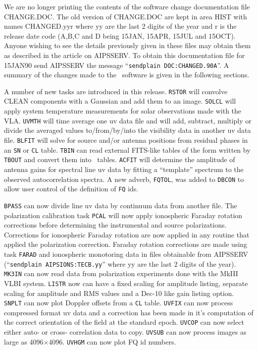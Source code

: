 
   We are no longer printing the contents of the software change
documentation file CHANGE.DOC.  The old version of CHANGE.DOC are kept
in area HIST with names CHANGED.yyr where yy are the last 2 digits of
the year and r is the release date code (A,B,C and D being 15JAN,
15APR, 15JUL and 15OCT).
Anyone wishing to see the details
previously given in these files may obtain them as described in the
article on AIPSSERV.  To obtain this documentation file for 15JAN90
send AIPSSERV the message ``{\tt sendplain DOC:CHANGED.90A}''.
A summary of the changes made to the \AIPS\
software is given in the following sections.


A number of new tasks are introduced in this release.
{\tt RSTOR} will convolve CLEAN components with a Gaussian and
add them to an image.
{\tt SOLCL} will apply system temperature measurements for solar
observations made with the VLA.
{\tt UVMTH} will time average one uv data file and will add,
subtract, multiply or divide the averaged values to/from/by/into the
visibility data in another uv data file.
{\tt BLFIT} will solve for source and/or antenna positions from
residual phases in an {\tt SN} or {\tt CL} table.
{\tt TBIN} can read external FITS-like tables of the form written
by {\tt TBOUT} and convert them into \AIPS\ tables.
{\tt ACFIT} will determine the amplitude of antenna gains for spectral line
uv data by fitting a ``template'' spectrum to the observed
autocorrelation spectra.
A new adverb, {\tt FQTOL}, was added to {\tt DBCON} to allow user
control of the definition of {\tt FQ} ids.

   {\tt BPASS} can now divide line uv data by continuum data from another file.
The polarization calibration task {\tt PCAL} will now apply ionospheric
Faraday rotation corrections before determining the instrumental and
source polarizations.
Corrections for ionospheric Faraday rotation are now applied in any
routine that applied the polarization correction.  Faraday rotation
corrections are made using task {\tt FARAD} and ionospheric monotoring
data in files obtainable from AIPSSERV (``{\tt sendplain
AIPSIONS:TECB.yy}'' where yy are the last 2 digits of the year).
{\tt MK3IN} can now read data from polarization experiments done with the
MkIII VLBI system.
{\tt LISTR} now can have a fixed scaling for amplitude listing, separate
scaling for amplitude and RMS values and a Dec-10 like gain listing
option.
{\tt SNPLT} can now plot Doppler offsets from a {\tt CL} table.
{\tt UVFIX} can now process compressed format uv data and a correction has
been made in it's computation of the correct orientation of the field
at the standard epoch.
{\tt UVCOP} can now select either auto- or cross- correlation data to copy.
{\tt UVSUB} can now process images as large as 4096$\times$4096.
{\tt UVHGM} can now plot FQ id numbers.


